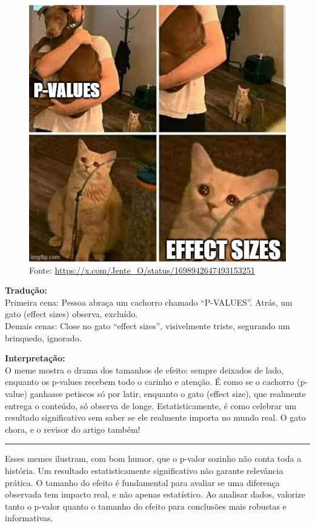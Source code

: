 \documentclass[
]{book}
\begin{document}
\begin{figure}
\centering
\includegraphics{p-value8.jpg}
\caption{Fonte: \url{https://x.com/Jente_O/status/1698942647493153251}}
\end{figure}

\textbf{Tradução:}\\
Primeira cena: Pessoa abraça um cachorro chamado ``P-VALUES''. Atrás, um gato (effect sizes) observa, excluído.\\
Demais cenas: Close no gato ``effect sizes'', visivelmente triste, segurando um brinquedo, ignorado.

\textbf{Interpretação:}\\
O meme mostra o drama dos tamanhos de efeito: sempre deixados de lado, enquanto os p-values recebem todo o carinho e atenção. É como se o cachorro (p-value) ganhasse petiscos só por latir, enquanto o gato (effect size), que realmente entrega o conteúdo, só observa de longe. Estatisticamente, é como celebrar um resultado significativo sem saber se ele realmente importa no mundo real. O gato chora, e o revisor do artigo também!

\begin{center}\rule{0.5\linewidth}{0.5pt}\end{center}

Esses memes ilustram, com bom humor, que o p-valor sozinho não conta toda a história. Um resultado estatisticamente significativo não garante relevância prática. O tamanho do efeito é fundamental para avaliar se uma diferença observada tem impacto real, e não apenas estatístico. Ao analisar dados, valorize tanto o p-valor quanto o tamanho do efeito para conclusões mais robustas e informativas.
\end{document}
